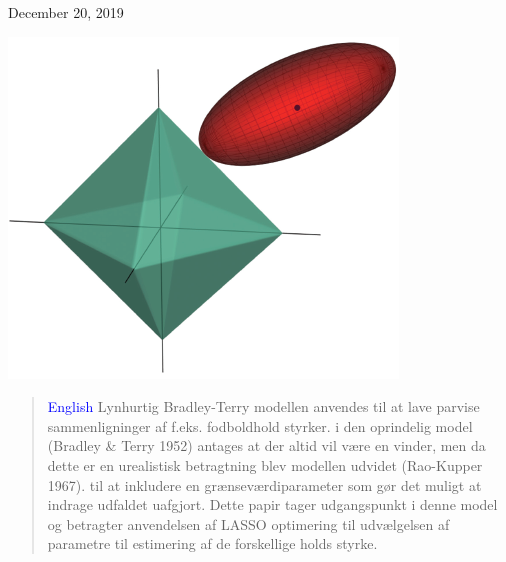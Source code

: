 \documentclass[11pt,a4paper]{article}
\renewcommand*\contentsname{Table of Contents}
\begin{document}
\begin{titlepage}
	
	
	\vfill\vfill\vfill %
	
	{\large{December 20, 2019}} %
	
	
	\includegraphics[width=0.7 \textwidth]{GLR2.png}\\[1cm] %
	 
	
	\vfill %
	
\end{titlepage}
\renewcommand{\contentsname}{Indholdsfortegnelse}
\clearpage
\tableofcontents
\clearpage
\newpage
{}
\begin{abstract}
\textcolor{blue}{English} Lynhurtig Bradley-Terry modellen anvendes til at lave parvise sammenligninger af f.eks. fodboldhold styrker. i den oprindelig model (Bradley \& Terry 1952) antages at der altid vil være en vinder, men da dette er en urealistisk betragtning blev modellen udvidet (Rao-Kupper 1967). til at inkludere en grænseværdiparameter som gør det muligt at indrage udfaldet uafgjort. Dette papir tager udgangspunkt i denne model og betragter anvendelsen af LASSO optimering til udvælgelsen af parametre til estimering af de forskellige holds styrke. 
\end{abstract}
\end{document}
